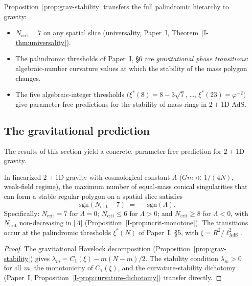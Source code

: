 Proposition~\ref{prop:grav-stability} transfers the full
palindromic hierarchy to gravity:
\begin{itemize}
  \item $N_{\mathrm{crit}} = 7$ on any spatial slice
    (universality, Paper~I, Theorem~\ref{I-thm:universality}).
  \item The palindromic thresholds of Paper~I, \S6 are
    \emph{gravitational phase transitions}: algebraic-number
    curvature values at which the stability of the mass
    polygon changes.
  \item The five algebraic-integer thresholds
    $(\xi^*(8) = 8{-}3\sqrt{7}$, \ldots,
    $\xi^*(23) = \varphi^{-2})$ give parameter-free
    predictions for the stability of mass rings in $2{+}1$D
    AdS.
\end{itemize}

\subsection{The gravitational prediction}
\label{sec:grav-prediction}

The results of this section yield a concrete, parameter-free
prediction for $2{+}1$D gravity.

\begin{proposition}
\label{prop:grav-ncrit}
In linearized $2{+}1$D gravity with cosmological constant
$\Lambda$ ($Gm \ll 1/(4N)$, weak-field regime), the maximum
number of equal-mass conical singularities that can form a
stable regular polygon on a spatial slice satisfies
\[
  \mathrm{sgn}(N_{\mathrm{crit}} - 7)
  \;=\; -\mathrm{sgn}(\Lambda).
\]
Specifically: $N_{\mathrm{crit}} = 7$ for $\Lambda = 0$;
$N_{\mathrm{crit}} \le 6$ for $\Lambda > 0$; and
$N_{\mathrm{crit}} \ge 8$ for $\Lambda < 0$, with
$N_{\mathrm{crit}}$ non-decreasing in $|{\Lambda}|$
(Proposition~\ref{I-prop:ncrit-monotone}).
The transitions occur at the palindromic thresholds
$\xi^*(N)$ of Paper~I, \S5, with
$\xi = R^2/\ell_{\mathrm{AdS}}^2$.
\end{proposition}

\begin{proof}
The gravitational Havelock decomposition
(Proposition~\ref{prop:grav-stability}) gives
$\lambda_m = C_1(\xi) - m(N{-}m)/2$.
The stability condition $\lambda_m > 0$ for all $m$,
the monotonicity of $C_1(\xi)$, and the curvature-stability
dichotomy (Paper~I,
Proposition~\ref{I-prop:curvature-dichotomy}) transfer
directly.
\end{proof}

